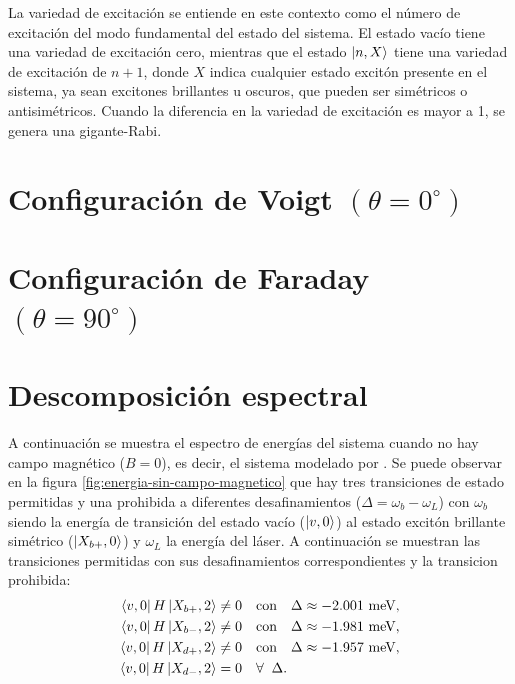 \documentclass[main.tex]{subfiles}
\begin{document}
La variedad de excitación se entiende en este contexto como el número de excitación del modo fundamental del estado del sistema. El estado vacío tiene una variedad de excitación cero, mientras que el estado $\ket{n,X}$ tiene una variedad de excitación de $n+1$, donde $X$ indica cualquier estado excitón presente en el sistema, ya sean excitones brillantes u oscuros, que pueden ser simétricos o antisimétricos. Cuando la diferencia en la variedad de excitación es mayor a 1, se genera una gigante-Rabi.

\section{Configuraci\'on de Voigt $(\theta = 0^\circ)$}

\section{Configuraci\'on de Faraday $(\theta = 90^\circ)$}

\section{Descomposici\'on espectral}

A continuaci\'on se muestra el espectro de energ\'ias del sistema cuando no hay campo magn\'etico ($B=0$), es decir, el sistema modelado por \parencite{Vargas2022}. Se puede observar en la figura \ref{fig:energia-sin-campo-magnetico} que hay tres transiciones de estado permitidas y una prohibida a diferentes desafinamientos ($\Delta = \omega_b-\omega_L$) con $\omega_b$ siendo la energ\'ia de transici\'on del estado vac\'io ($\ket{v,0}$) al estado excit\'on brillante sim\'etrico ($\ket{X_{b+},0}$) y $\omega_L$ la energ\'ia del l\'aser. A continuaci\'on se muestran las transiciones permitidas con sus desafinamientos correspondientes y la transicion prohibida:
\begin{align}
	\bra{v,0}H\ket{X_{b+},2} &\neq 0 \quad \text{con} \quad \Delta \approx -2.001 \text{ meV},\\
	\bra{v,0}H\ket{X_{b-},2} &\neq 0 \quad \text{con} \quad \Delta \approx -1.981 \text{ meV},\\
	\bra{v,0}H\ket{X_{d+},2} &\neq 0 \quad \text{con} \quad \Delta \approx -1.957 \text{ meV},\\
	\bra{v,0}H\ket{X_{d-},2} &= 0 \quad \forall \;\; \Delta.
\end{align}
\end{document}

